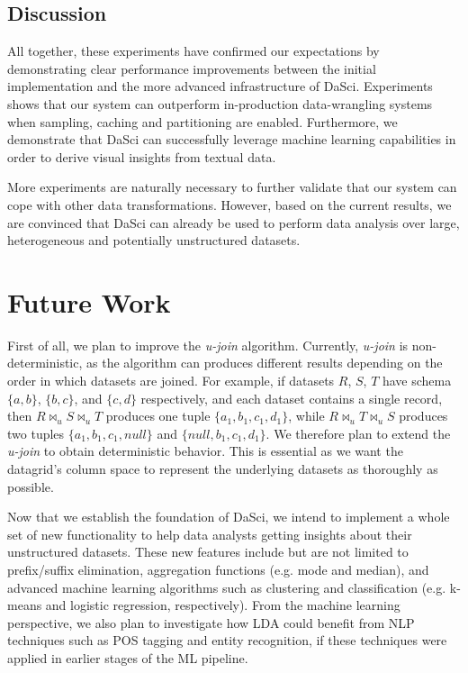 \documentclass[10pt, a4paper, twocolumn]{article} %
\begin{document}
\subsection{Discussion}

All together, these experiments have confirmed our expectations by demonstrating clear performance improvements between the initial implementation and the more advanced infrastructure of DaSci. Experiments shows that our system can outperform in-production data-wrangling systems when sampling, caching and partitioning are enabled. 
Furthermore, we demonstrate that DaSci can successfully leverage machine learning capabilities in order to derive visual insights from textual data.

More experiments are naturally necessary to further validate that our system can cope with other data transformations. However, based on the current results, we are convinced that DaSci can already be used to perform data analysis over large, heterogeneous and potentially unstructured datasets.



\section{Future Work}
\label{section:future-work}

First of all, we plan to improve the \textit{u-join} algorithm.
Currently, \textit{u-join} is non-deterministic, as the algorithm can produces different results depending on the order in which datasets are joined.
For example, if datasets $R$, $S$, $T$ have schema $\{a,b\}$, $\{b,c\}$, and $\{c,d\}$ respectively, and each dataset contains a single record, then $R \Join_u S \Join_u T$ produces one tuple $\{a_1,b_1,c_1,d_1\}$, while $R \Join_u T \Join_u S$ produces two tuples $\{a_1,b_1,c_1,null\}$ and $\{null,b_1,c_1,d_1\}$.
We therefore plan to extend the \textit{u-join} to obtain deterministic behavior.
This is essential as we want the datagrid's column space to represent the underlying datasets as thoroughly as possible.

Now that we establish the foundation of DaSci, we intend to implement a whole set of new functionality to help data analysts getting insights about their unstructured datasets.
These new features include but are not limited to prefix/suffix elimination, aggregation functions (e.g. mode and median), and advanced machine learning algorithms such as clustering and classification (e.g. k-means and logistic regression, respectively).
From the machine learning perspective, we also plan to investigate how LDA could benefit from NLP techniques such as POS tagging and entity recognition, if these techniques were applied in earlier stages of the ML pipeline.
\end{document}
